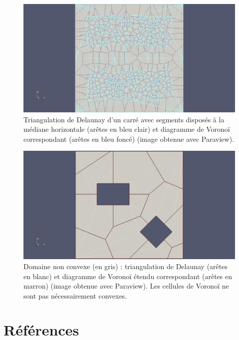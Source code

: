 \documentclass[12pt,a4paper]{report}
\begin{document}
\begin{figure}[htbp]
\begin{center}
\includegraphics[scale=0.35, viewport=530 0 1680 1129, clip]{del_vor.jpg}
\caption{Triangulation de Delaunay d'un carré avec segments disposés à la médiane horizontale (arêtes en bleu clair) et diagramme de Voronoï correspondant (arêtes en bleu foncé) (image obtenue avec Paraview).}
\label{del_vor}
\end{center}
\end{figure}


\begin{center}
\begin{figure}[htbp]
\includegraphics[scale=0.35, viewport=530 0 1680 1129, clip]{sq_del_vor.jpg}
\caption{Domaine non convexe (en gris) : triangulation de Delaunay (arêtes en blanc) et diagramme de Voronoï étendu correspondant (arêtes en marron) (image obtenue avec Paraview). Les cellules de Voronoï ne sont pas nécessairement convexes.}
\label{sq_del_vor}
\end{figure}
\end{center}
\clearpage

\section{Références}
\vspace*{1cm}
\end{document}
